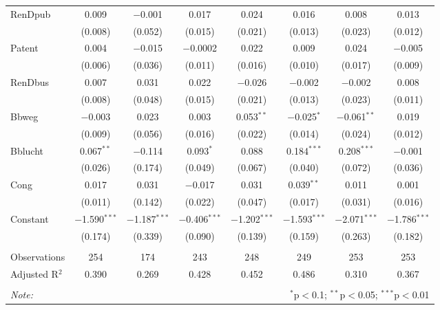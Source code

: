 \begin{table}[t!]
\begin{tabular}{@{\extracolsep{5pt}}lccccccc}
  RenDpub & 0.009 & $-$0.001 & 0.017 & 0.024 & 0.016 & 0.008 & 0.013 \\ 
  & (0.008) & (0.052) & (0.015) & (0.021) & (0.013) & (0.023) & (0.012) \\ 
  Patent & 0.004 & $-$0.015 & $-$0.0002 & 0.022 & 0.009 & 0.024 & $-$0.005 \\ 
  & (0.006) & (0.036) & (0.011) & (0.016) & (0.010) & (0.017) & (0.009) \\ 
  RenDbus & 0.007 & 0.031 & 0.022 & $-$0.026 & $-$0.002 & $-$0.002 & 0.008 \\ 
  & (0.008) & (0.048) & (0.015) & (0.021) & (0.013) & (0.023) & (0.011) \\ 
  Bbweg & $-$0.003 & 0.023 & 0.003 & 0.053$^{**}$ & $-$0.025$^{*}$ & $-$0.061$^{**}$ & 0.019 \\ 
  & (0.009) & (0.056) & (0.016) & (0.022) & (0.014) & (0.024) & (0.012) \\ 
  Bblucht & 0.067$^{**}$ & $-$0.114 & 0.093$^{*}$ & 0.088 & 0.184$^{***}$ & 0.208$^{***}$ & $-$0.001 \\ 
  & (0.026) & (0.174) & (0.049) & (0.067) & (0.040) & (0.072) & (0.036) \\ 
  Cong & 0.017 & 0.031 & $-$0.017 & 0.031 & 0.039$^{**}$ & 0.011 & 0.001 \\ 
  & (0.011) & (0.142) & (0.022) & (0.047) & (0.017) & (0.031) & (0.016) \\ 
  Constant & $-$1.590$^{***}$ & $-$1.187$^{***}$ & $-$0.406$^{***}$ & $-$1.202$^{***}$ & $-$1.593$^{***}$ & $-$2.071$^{***}$ & $-$1.786$^{***}$ \\ 
  & (0.174) & (0.339) & (0.090) & (0.139) & (0.159) & (0.263) & (0.182) \\ 
 \hline \\[-1.8ex] 
Observations & 254 & 174 & 243 & 248 & 249 & 253 & 253 \\ 
Adjusted R$^{2}$ & 0.390 & 0.269 & 0.428 & 0.452 & 0.486 & 0.310 & 0.367 \\ 
\hline 
\hline \\[-1.8ex] 
\textit{Note:}  & \multicolumn{7}{r}{$^{*}$p$<$0.1; $^{**}$p$<$0.05; $^{***}$p$<$0.01} \\ 
\end{tabular} 
\end{table} 
